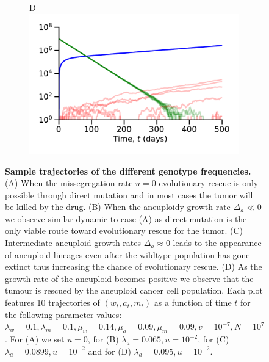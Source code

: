 \documentclass[12pt]{extarticle}
\begin{document}
\begin{figure}
\begin{subfigure}{0.5\textwidth}
\end{subfigure}
\begin{subfigure}{0.5\textwidth}
D\\
\includegraphics[width=1\textwidth]{Figures/TauLeapMeanTimeDiagramlargeda.pdf}
\end{subfigure}
\caption{
\textbf{Sample trajectories of the different genotype frequencies.}
(A) When the missegregation rate $u=0$ evolutionary rescue is only possible through direct mutation and in most cases the tumor will be killed by the drug. (B) When the aneuploidy growth rate $\Delta_a\ll0$ we observe similar dynamic to case (A) as direct mutation is the only viable route toward evolutionary rescue for the tumor. (C) Intermediate aneuploid growth rates $\Delta_a\approx0$ leads to the appearance of aneuploid lineages even after the wildtype population has gone extinct thus increasing the chance of evolutionary rescue. (D) As the growth rate of the aneuploid becomes positive we observe that the tumour is rescued by the aneuploid cancer cell population. Each plot features 10 trajectories of $\left(w_t,a_t,m_t\right)$ as a function of time $t$ for the following parameter values: $\lambda_w=0.1,\lambda_m=0.1,\mu_w=0.14,\mu_a=0.09,\mu_m=0.09, v=10^{-7},N=10^7$. For (A) we set $u=0$, for (B) $\lambda_a=0.065,u=10^{-2}$, for (C) $\lambda_a=0.0899,u=10^{-2}$ and for (D) $\lambda_a=0.095,u=10^{-2}$.
}
\label{sampleTrajectories}
\end{figure}

\end{document}

